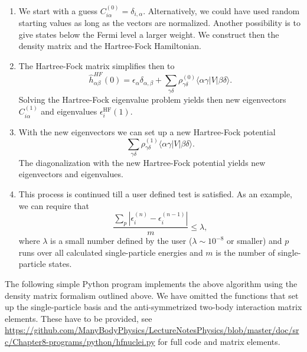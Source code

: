 \begin{svgraybox}
\begin{enumerate}
\item We start with a guess
  $C_{i\alpha}^{(0)}=\delta_{i,\alpha}$. Alternatively, we could have
  used random starting values as long as the vectors are
  normalized. Another possibility is to give states below the Fermi
  level a larger weight. We construct then the density matrix and the 
Hartree-Fock Hamiltonian. 
\item The Hartree-Fock matrix simplifies then to
\[
\hat{h}_{\alpha\beta}^{HF}(0)=\epsilon_{\alpha}\delta_{\alpha,\beta}+
\sum_{\gamma\delta} \rho_{\gamma\delta}^{(0)}\langle \alpha\gamma|V|\beta\delta\rangle.
\]
Solving the Hartree-Fock eigenvalue problem yields then new eigenvectors $C_{i\alpha}^{(1)}$ and eigenvalues
$\epsilon_i^{\mathrm{HF}}(1)$. 
\item With the new eigenvectors we can set up a new Hartree-Fock potential 
\[
\sum_{\gamma\delta} \rho_{\gamma\delta}^{(1)}\langle \alpha\gamma|V|\beta\delta\rangle.
\]
The diagonalization with the new Hartree-Fock potential yields new eigenvectors and eigenvalues.
\item This process is continued till a user defined test is
  satisfied. As an example, we can require that
\[
\frac{\sum_{p} |\epsilon_i^{(n)}-\epsilon_i^{(n-1)}|}{m} \le \lambda,
\]
where $\lambda$ is a small number defined by the user ($\lambda \sim
10^{-8}$ or smaller) and $p$ runs over all calculated single-particle
energies and $m$ is the number of single-particle states.

\end{enumerate}
\end{svgraybox}
The following simple Python program implements the above algorithm using the density matrix formalism outlined above.
We have omitted the functions that set up the single-particle basis and the anti-symmetrized two-body interaction matrix elements.
These have to be provided, see \url{https://github.com/ManyBodyPhysics/LectureNotesPhysics/blob/master/doc/src/Chapter8-programs/python/hfnuclei.py}
for full code and matrix elements.
